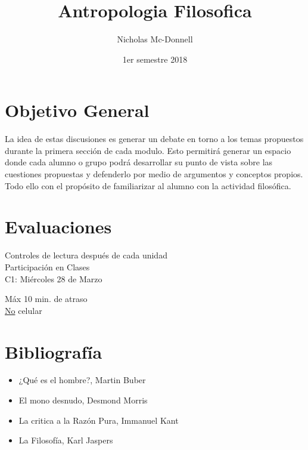 

\title{Antropologia Filosofica}
\author{Nicholas Mc-Donnell}
\date{1er semestre 2018}



    \maketitle

    \section*{Objetivo General}
    La idea de estas discusiones es generar un debate en torno a los temas propuestos durante la primera sección de cada modulo. Esto permitirá generar un espacio donde cada alumno o grupo podrá desarrollar su punto de vista sobre las cuestiones propuestas y defenderlo por medio de argumentos y conceptos propios. Todo ello con el propósito de familiarizar al alumno con la actividad filosófica.

    \section*{Evaluaciones}
    { Controles de lectura después de cada unidad}\\
    Participación en Clases\\
    C1: Miércoles 28 de Marzo

    \begin{obs}
        Máx 10 min. de atraso\\
        \underline{No} celular
    \end{obs}

    \section*{Bibliografía}
    \begin{itemize}
        \item ¿Qué es el hombre?, Martin Buber

        \item El mono desnudo, Desmond Morris

        \item La critica a la Razón Pura, Immanuel Kant

        \item La Filosofía, Karl Jaspers
    \end{itemize}
    \newpage

